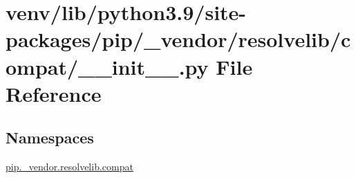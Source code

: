 \hypertarget{venv_2lib_2python3_89_2site-packages_2pip_2__vendor_2resolvelib_2compat_2____init_____8py}{}\section{venv/lib/python3.9/site-\/packages/pip/\+\_\+vendor/resolvelib/compat/\+\_\+\+\_\+init\+\_\+\+\_\+.py File Reference}
\label{venv_2lib_2python3_89_2site-packages_2pip_2__vendor_2resolvelib_2compat_2____init_____8py}
\subsection*{Namespaces}
\begin{DoxyCompactItemize}
\item 
 \hyperlink{namespacepip_1_1__vendor_1_1resolvelib_1_1compat}{pip.\+\_\+vendor.\+resolvelib.\+compat}
\end{DoxyCompactItemize}
